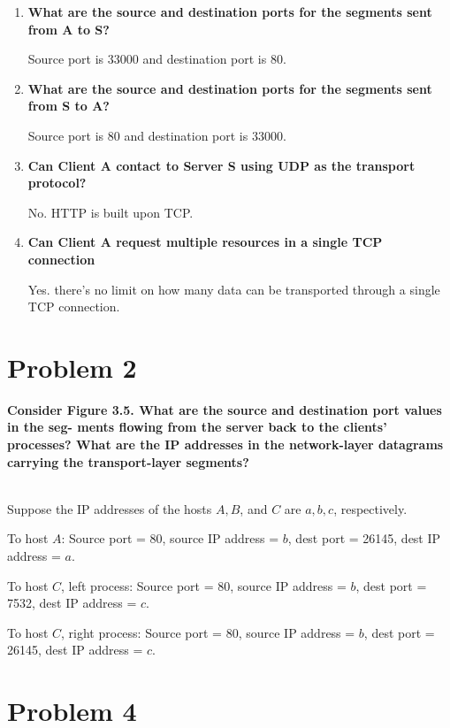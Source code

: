 \documentclass[11pt]{article}
\newenvironment{qparts}{\begin{enumerate}[{(}a{)}]}{\end{enumerate}}
\begin{document}
\begin{qparts}

	\item \textbf{What are the source and destination ports for the segments sent from A to S?}
	
	Source port is 33000 and destination port is 80.
	
	\item \textbf{What are the source and destination ports for the segments sent from S to A?}

	Source port is 80 and destination port is 33000.
	
	\item \textbf{Can Client A contact to Server S using UDP as the transport protocol?}
	
	No. HTTP is built upon TCP.
	
	\item \textbf{Can Client A request multiple resources in a single TCP connection}
	
	Yes. there's no limit on how many data can be transported through a single TCP connection.

\end{qparts}


\newpage
\section{Problem 2}

\textbf{Consider Figure 3.5. What are the source and destination port values in the seg- ments flowing from the server back to the clients’ processes? What are the IP addresses in the network-layer datagrams carrying the transport-layer segments?}

~\\

Suppose the IP addresses of the hosts $A, B$, and $C$ are $a, b, c$, respectively. 

To host $A$: Source port = 80, source IP address = $b$, dest port = 26145, dest IP address = $a$.

To host $C$, left process: Source port = 80, source IP address = $b$, dest port = 7532, dest IP address = $c$.

To host $C$, right process: Source port = 80, source IP address = $b$, dest port = 26145, dest IP address = $c$.


\newpage
\section{Problem 4}
\end{document}
